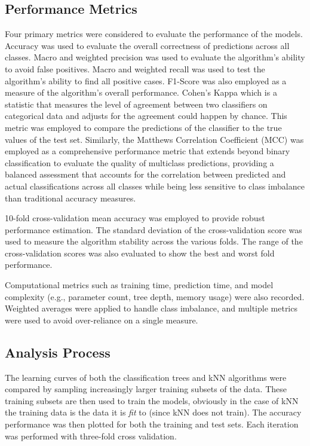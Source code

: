 \documentclass[10pt, conference]{IEEEtran}
\begin{document}
\subsection{Performance Metrics}
Four primary metrics were considered to evaluate the performance of the models. Accuracy was used to evaluate the overall correctness of predictions across all classes.  Macro and weighted precision was used to evaluate the algorithm's ability to avoid false positives. Macro and weighted recall was used to test the algorithm's ability to find all positive cases. F1-Score was also employed as a measure of the algorithm's overall performance. Cohen's Kappa which is a statistic that measures the level of agreement between two classifiers on categorical data and adjusts for the agreement could happen by chance. This metric was employed to compare the predictions of the classifier to the true values of the test set. Similarly, the Matthews Correlation Coefficient (MCC) was employed as a comprehensive performance metric that extends beyond binary classification to evaluate the quality of multiclass predictions, providing a balanced assessment that accounts for the correlation between predicted and actual classifications across all classes while being less sensitive to class imbalance than traditional accuracy measures.

10-fold cross-validation mean accuracy was employed to provide robust performance estimation. The standard deviation of the cross-validation score was used to measure the algorithm stability across the various folds. The range of the cross-validation scores was also evaluated to show the best and worst fold performance. 

Computational metrics such as training time, prediction time, and model complexity (e.g., parameter count, tree depth, memory usage) were also recorded. Weighted averages were applied to handle class imbalance, and multiple metrics were used to avoid over-reliance on a single measure.

\subsection{Analysis Process}



The learning curves of both the classification trees and kNN algorithms were compared by sampling increasingly larger training subsets of the data. These training subsets are then used to train the models, obviously in the case of kNN the training data is the data it is \textit{fit} to (since kNN does not train). The accuracy performance was then plotted for both the training and test sets. Each iteration was performed with three-fold cross validation.
\end{document}
